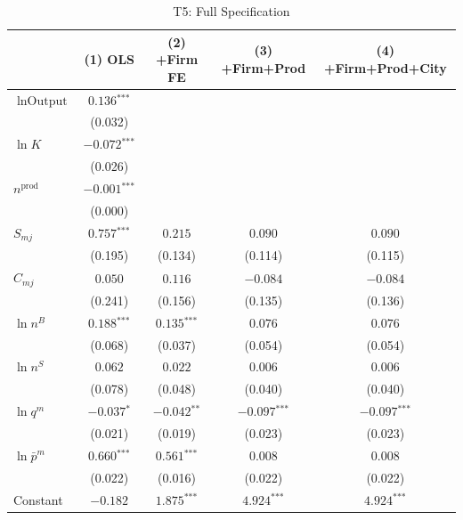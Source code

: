 \documentclass[12pt]{article}
\newcommand{\sym}[1]{\ensuremath{^{\text{#1}}}}
\newcommand{\se}[1]{{\small(#1)}}
\newcommand{\abs}{\textemdash}
\begin{document}
\begin{landscape}
\begin{table}[H]
  \centering
  \caption{T5: Full Specification}
  \label{tab:t5}
  \begin{threeparttable}
    \begin{tabular}{lcccc}
      \toprule
      & (1) OLS & (2) +Firm FE & (3) +Firm+Prod & (4) +Firm+Prod+City \\
      \midrule
      \(\ln \text{Output}\) & \(0.136\sym{***}\) & \abs & \abs & \abs \\
                             & \se{0.032} & & & \\[4pt]
      \(\ln K\) & \(-0.072\sym{***}\) & \abs & \abs & \abs \\
                & \se{0.026} & & & \\[4pt]
      \(n^{\text{prod}}\) & \(-0.001\sym{***}\) & \abs & \abs & \abs \\
                          & \se{0.000} & & & \\[4pt]
      \(S_{mj}\) & \(0.757\sym{***}\) & \(0.215\) & \(0.090\) & \(0.090\) \\
                 & \se{0.195} & \se{0.134} & \se{0.114} & \se{0.115} \\[4pt]
      \(C_{mj}\) & \(0.050\) & \(0.116\) & \(-0.084\) & \(-0.084\) \\
                 & \se{0.241} & \se{0.156} & \se{0.135} & \se{0.136} \\[4pt]
      \(\ln n^{B}\) & \(0.188\sym{***}\) & \(0.135\sym{***}\) & \(0.076\) & \(0.076\) \\
                    & \se{0.068} & \se{0.037} & \se{0.054} & \se{0.054} \\[4pt]
      \(\ln n^{S}\) & \(0.062\) & \(0.022\) & \(0.006\) & \(0.006\) \\
                    & \se{0.078} & \se{0.048} & \se{0.040} & \se{0.040} \\[4pt]
      \(\ln q^{m}\) & \(-0.037\sym{*}\) & \(-0.042\sym{**}\) & \(-0.097\sym{***}\) & \(-0.097\sym{***}\) \\
                    & \se{0.021} & \se{0.019} & \se{0.023} & \se{0.023} \\[4pt]
      \(\ln \bar{p}^{m}\) & \(0.660\sym{***}\) & \(0.561\sym{***}\) & \(0.008\) & \(0.008\) \\
                          & \se{0.022} & \se{0.016} & \se{0.022} & \se{0.022} \\[4pt]
      Constant & \(-0.182\) & \(1.875\sym{***}\) & \(4.924\sym{***}\) & \(4.924\sym{***}\) \\

\end{tabular}
\end{threeparttable}
\end{table}
\end{landscape}
\end{document}
